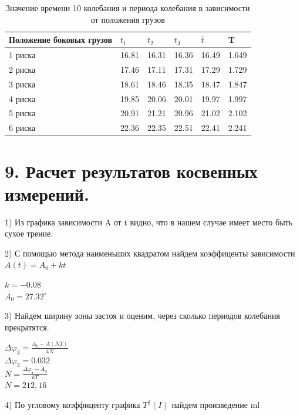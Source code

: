 \documentclass[14pt]{extreport}
\begin{document}
\begin{table}[!h]
    \centering
    \begin{tabular}{|l|l|l|l|l|l|}
    \hline
        Положение боковых грузов & $t_1$ & $t_2$ & $t_3$ & $\overline{t}$ & T  \\ \hline
        1 риска & 16.81 & 16.31 & 16.36 & 16.49 & 1.649  \\ \hline
        2 риска & 17.46 & 17.11 & 17.31 & 17.29 & 1.729  \\ \hline
        3 риска & 18.61 & 18.46 & 18.35 & 18.47 & 1.847  \\ \hline
        4 риска & 19.85 & 20.06 & 20.01 & 19.97 & 1.997  \\ \hline
        5 риска & 20.91 & 21.21 & 20.96 & 21.02 & 2.102  \\ \hline
        6 риска & 22.36 & 22.35 & 22.51 & 22.41 & 2.241 \\ \hline
    \end{tabular}
    \caption{Значение времени 10 колебания и периода колебания в зависимости от положения грузов}
\end{table}

\newpage


\section*{9. Расчет результатов косвенных измерений.}

1) Из графика зависимости A от t видно, что в нашем случае имеет место быть сухое трение. 

2) С помощью метода наименьших квадратом найдем коэффиценты зависимости
$A(t) = A_0 + kt$

\begin{center}
    $k = -0.08$ \\ 
    $A_0 = 27.32^\circ $
\end{center}

3) Найдем ширину зоны застоя и оценим, через сколько периодов колебания прекратятся.

\begin{center}
    $\Delta \varphi_{3} = \frac{A_0 - A(NT)}{4N}$ \\
    $\Delta \varphi_{3} = 0.032$ \\
    $N = \frac{\Delta \varphi_{з} - A_0}{kT}$ \\
    $N = 212,16 $
\end{center} 

4) По угловому коэффиценту графика $T^2(I)$ найдем произведение ml
\end{document}
